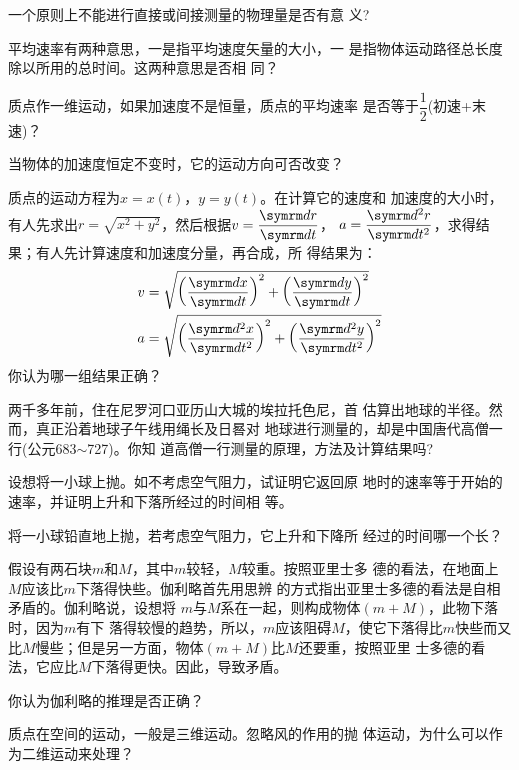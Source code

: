 \begin{questions}

\question 一个原则上不能进行直接或间接测量的物理量是否有意
义?

\question 平均速率有两种意思，一是指平均速度矢量的大小，一
是指物体运动路径总长度除以所用的总时间。这两种意思是否相
同？

\question 质点作一维运动，如果加速度不是恒量，质点的平均速率
是否等于$\dfrac 1 2$(初速+末速)？

\question 当物体的加速度恒定不变时，它的运动方向可否改变？

\question 质点的运动方程为$x=x(t)$，$y=y(t)$。在计算它的速度和
加速度的大小时，有人先求出$r=\sqrt{x^2+y^2}$，然后根据$v=\dfrac{ \dif r}{ \dif t}$，
$a=\dfrac{ \dif ^2r}{ \dif t^2}$，求得结果；有人先计算速度和加速度分量，再合成，所
得结果为：\vspace{-1em}
\begin{equation*}
    \begin{aligned}
        v &=\sqrt{\left(\frac{ \dif  x}{ \dif  t}\right)^{2}+\left(\frac{ \dif  y}{ \dif  t}\right)^{2}} \\
        a &=\sqrt{\left(\frac{ \dif ^{2} x}{ \dif  t^{2}}\right)^{2}+\left(\frac{ \dif ^{2} y}{ \dif  t^{2}}\right)^{2}}
    \end{aligned}
\end{equation*}
你认为哪一组结果正确？

\question  两千多年前，住在尼罗河口亚历山大城的埃拉托色尼，首
估算出地球的半径。然而，真正沿着地球子午线用绳长及日晷对
地球进行测量的，却是中国唐代高僧一行(公元683$\sim$727)。你知
道高僧一行测量的原理，方法及计算结果吗?

\question  设想将一小球上抛。如不考虑空气阻力，试证明它返回原
地时的速率等于开始的速率，并证明上升和下落所经过的时间相
等。

\question  将一小球铅直地上抛，若考虑空气阻力，它上升和下降所
经过的时间哪一个长？

\question  假设有两石块$m$和$M$，其中$m$较轻，$M$较重。按照亚里士多
德的看法，在地面上$M$应该比$m$下落得快些。伽利略首先用思辨
的方式指出亚里士多德的看法是自相矛盾的。伽利略说，设想将
$m$与$M$系在一起，则构成物体$(m+M)$，此物下落时，因为$m$有下
落得较慢的趋势，所以，$m$应该阻碍$M$，使它下落得比$m$快些而又
比$M$慢些；但是另一方面，物体$(m+M)$比$M$还要重，按照亚里
士多德的看法，它应比$M$下落得更快。因此，导致矛盾。

你认为伽利略的推理是否正确？

\question  质点在空间的运动，一般是三维运动。忽略风的作用的抛
体运动，为什么可以作为二维运动来处理？
\end{questions}
